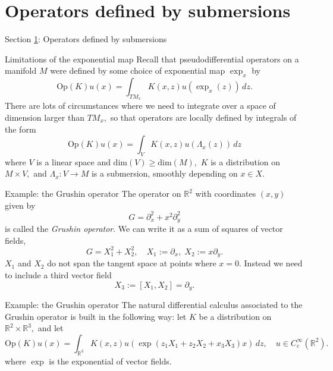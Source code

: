 \documentclass{beamer}
\numberwithin{equation}{section}
\theoremstyle{plain}
\theoremstyle{plain}
\theoremstyle{definition}
\theoremstyle{plain}
\theoremstyle{plain}
\theoremstyle{definition}
\newcommand{\Rl}{\mathbb{R}}
\newcommand{\Op}{\mathrm{Op}}
\begin{document}
\section{Operators defined by submersions}\label{submersion_section}

\begin{frame}
    \huge{Section \ref{submersion_section}: Operators defined by submersions}
\end{frame}

\begin{frame}{Limitations of the exponential map}
    Recall that pseudodifferential operators on a manifold $M$ were defined by some choice of exponential map $\exp_x$ by 
    \[
        \Op(K)u(x) = \int_{TM_x} K(x,z)u(\exp_x(z))\,dz.
    \]
    There are lots of circumstances where we need to integrate over a space of dimension larger than $TM_x,$ so that operators are locally defined by integrals of the form
    \[
        \Op(K)u(x) = \int_V K(x,z)u(\Lambda_x(z))\,dz
    \]
    where $V$ is a linear space and $\mathrm{dim}(V)\geq \mathrm{dim}(M),$ $K$ is a distribution on $M\times V,$ and $\Lambda_x:V\to M$ is a submersion, smoothly depending on $x \in X.$   
\end{frame}

\begin{frame}{Example: the Grushin operator}
    The operator on $\Rl^2$ with coordinates $(x,y)$ given by
    \[
        G = \partial_x^2+x^2\partial_y^2
    \]
    is called the \emph{Grushin operator}. We can write it as a sum of squares of vector fields,
    \[
        G = X_1^2+X_2^2,\quad X_1 := \partial_x,\; X_2 := x\partial_y.
    \]
    $X_1$ and $X_2$ do not span the tangent space at points where $x=0.$ Instead we need to include a third vector field
    \[
        X_3 := [X_1,X_2] = \partial_y.
    \]
\end{frame}

\begin{frame}{Example: the Grushin operator}
    The natural differential calculus associated to the Grushin operator is built in the following way: let $K$ be a distribution on $\Rl^2\times \Rl^3,$ and let
    \[
        \Op(K)u(x) = \int_{\Rl^3} K(x,z)u(\exp(z_1X_1+z_2X_2+x_3X_3)x)\,dz,\quad u\in C^\infty_c(\Rl^2).
    \]
    where $\exp$ is the exponential of vector fields.
\end{frame}
\end{document}
